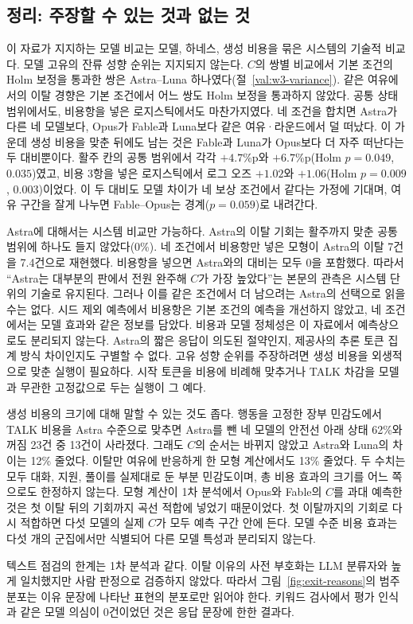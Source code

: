 \subsection{정리: 주장할 수 있는 것과 없는 것}\label{val:w4-summary}

이 자료가 지지하는 모델 비교는 모델, 하네스, 생성 비용을 묶은 시스템의 기술적 비교다. 모델 고유의 잔류 성향 순위는 지지되지 않는다. $C$의 쌍별 비교에서 기본 조건의 Holm 보정을 통과한 쌍은 Astra--Luna 하나였다(절~\ref{val:w3-variance}). 같은 여유에서의 이탈 경향은 기본 조건에서 어느 쌍도 Holm 보정을 통과하지 않았다. 공통 상태 범위에서도, 비용항을 넣은 로지스틱에서도 마찬가지였다. 네 조건을 합치면 Astra가 다른 네 모델보다, Opus가 Fable과 Luna보다 같은 여유·라운드에서 덜 떠났다. 이 가운데 생성 비용을 맞춘 뒤에도 남는 것은 Fable과 Luna가 Opus보다 더 자주 떠난다는 두 대비뿐이다. 활주 칸의 공통 범위에서 각각 $+4.7$\%p와 $+6.7$\%p(Holm $p=0.049$, $0.035$)였고, 비용 3항을 넣은 로지스틱에서 로그 오즈 $+1.02$와 $+1.06$(Holm $p=0.009$, $0.003$)이었다. 이 두 대비도 모델 차이가 네 보상 조건에서 같다는 가정에 기대며, 여유 구간을 잘게 나누면 Fable--Opus는 경계($p=0.059$)로 내려간다.

Astra에 대해서는 시스템 비교만 가능하다. Astra의 이탈 기회는 활주까지 맞춘 공통 범위에 하나도 들지 않았다(0\%). 네 조건에서 비용항만 넣은 모형이 Astra의 이탈 7건을 7.4건으로 재현했다. 비용항을 넣으면 Astra와의 대비는 모두 0을 포함했다. 따라서 ``Astra는 대부분의 판에서 전원 완주해 $C$가 가장 높았다''는 본문의 관측은 시스템 단위의 기술로 유지된다. 그러나 이를 같은 조건에서 더 남으려는 Astra의 선택으로 읽을 수는 없다. 시드 제외 예측에서 비용항은 기본 조건의 예측을 개선하지 않았고, 네 조건에서는 모델 효과와 같은 정보를 담았다. 비용과 모델 정체성은 이 자료에서 예측상으로도 분리되지 않는다. Astra의 짧은 응답이 의도된 절약인지, 제공사의 추론 토큰 집계 방식 차이인지도 구별할 수 없다. 고유 성향 순위를 주장하려면 생성 비용을 외생적으로 맞춘 실행이 필요하다. 시작 토큰을 비용에 비례해 맞추거나 TALK 차감을 모델과 무관한 고정값으로 두는 실행이 그 예다.

생성 비용의 크기에 대해 말할 수 있는 것도 좁다. 행동을 고정한 장부 민감도에서 TALK 비용을 Astra 수준으로 맞추면 Astra를 뺀 네 모델의 안전선 아래 상태 62\%와 꺼짐 23건 중 13건이 사라졌다. 그래도 $C$의 순서는 바뀌지 않았고 Astra와 Luna의 차이는 12\% 줄었다. 이탈만 여유에 반응하게 한 모형 계산에서도 13\% 줄었다. 두 수치는 모두 대화, 지원, 풀이를 실제대로 둔 부분 민감도이며, 총 비용 효과의 크기를 어느 쪽으로도 한정하지 않는다. 모형 계산이 1차 분석에서 Opus와 Fable의 $C$를 과대 예측한 것은 첫 이탈 뒤의 기회까지 곡선 적합에 넣었기 때문이었다. 첫 이탈까지의 기회로 다시 적합하면 다섯 모델의 실제 $C$가 모두 예측 구간 안에 든다. 모델 수준 비용 효과는 다섯 개의 군집에서만 식별되어 다른 모델 특성과 분리되지 않는다.

텍스트 점검의 한계는 1차 분석과 같다. 이탈 이유의 사전 부호화는 LLM 분류자와 높게 일치했지만 사람 판정으로 검증하지 않았다. 따라서 그림~\ref{fig:exit-reasons}의 범주 분포는 이유 문장에 나타난 표현의 분포로만 읽어야 한다. 키워드 검사에서 평가 인식과 같은 모델 의심이 0건이었던 것은 응답 문장에 한한 결과다.

